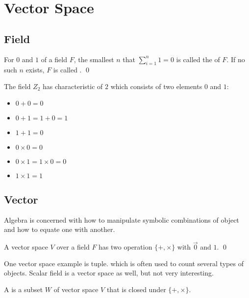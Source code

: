 \section{Vector Space}

\subsection{Field}

\begin{definition}
    For $0$ and $1$ of a field $F$, the smallest $n$ that $\displaystyle \sum_{i=1}^n 1 = 0$ is called the  of $F$. If no such $n$ exists, $F$ is called .
    \qed
\end{definition}

\begin{definition}
    The field $Z_2$ has characteristic of $2$ which consists of two elements $0$ and $1$:
    \begin{itemize}
        \item $0 + 0 = 0$
        \item $0 + 1 = 1 + 0 = 1$
        \item $1 + 1 = 0$
        \item $0 \times 0 = 0$
        \item $0 \times 1 = 1 \times 0 = 0$
        \item $1 \times 1 = 1$
    \end{itemize}
\end{definition}

\subsection{Vector}

Algebra is concerned with how to manipulate symbolic combinations of object and how to equate one with another.

\begin{definition}
A  vector space $V$ over a  field $F$ has two operation $\{+,\times\}$ with $\vec{0}$ and $1$. \qed
\end{definition}

One vector space example is tuple. which is often used to count several types of objects. Scalar field is a vector space as well, but not very interesting.


\begin{definition}
	A  is a subset $W$ of vector space $V$ that is closed under $\{+,\times\}$.
\end{definition}

